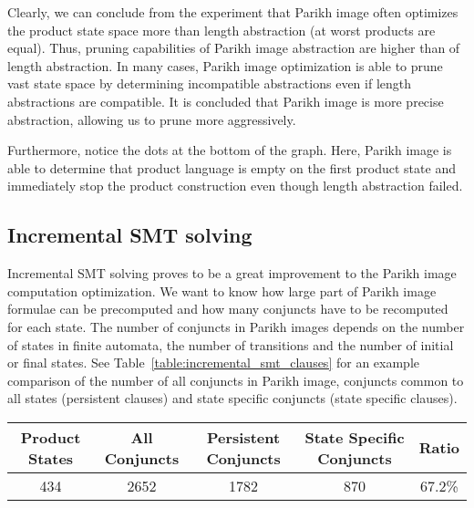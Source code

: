 Clearly, we can conclude from the experiment that Parikh image often optimizes the product state space more than length abstraction (at worst products are equal). Thus, pruning capabilities of Parikh image abstraction are higher than of length abstraction. In many cases, Parikh image optimization is able to prune vast state space by determining incompatible abstractions even if length abstractions are compatible. It is concluded that Parikh image is more precise abstraction, allowing us to prune more aggressively.

Furthermore, notice the dots at the bottom of the graph. Here, Parikh image is able to determine that product language is empty on the first product state and immediately stop the product construction even though length abstraction failed.

\subsection{Incremental SMT solving}

Incremental SMT solving proves to be a great improvement to the Parikh image computation optimization. We want to know how large part of Parikh image formulae can be precomputed and how many conjuncts have to be recomputed for each state. The number of conjuncts in Parikh images depends on the number of states in finite automata, the number of transitions and the number of initial or final states. See Table~\ref{table:incremental_smt_clauses} for an example comparison of the number of all conjuncts in Parikh image, conjuncts common to all states (persistent clauses) and state specific conjuncts (state specific clauses).

\begin{table*}[ht]
	\centering
	\small
    \begin{tabular}{ |c|c|c|c|c| }
        \hline
        Product States & All Conjuncts & Persistent Conjuncts & State Specific Conjuncts & Ratio \\ \hline
        434 & 2652 & 1782 & 870 & 67.2\% \\ \hline
    \end{tabular}
    \caption{An example proportion of persistent and state specific conjuncts in Parikh image computation with incremental SMT solving optimization. \emph{Product States} column shows the number of product states in the whole intersection product, \emph{All Conjuncts} column shows the number of conjuncts in each computed Parikh image, \emph{Persistent Conjuncts} column shows the number of persistent conjuncts in the whole Parikh image (out of the all Parikh image conjuncts), \emph{State Specific Conjuncts} column states how many Parikh image conjuncts have to be recomputed for each product state and \emph{Ratio} column shows the ratio of persistent conjuncts in all Parikh image conjuncts.}
    \label{table:incremental_smt_clauses}
\end{table*}

